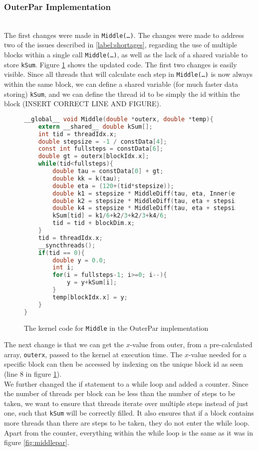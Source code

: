 \subsubsection{OuterPar Implementation} \hfill \\
The first changes were made in \texttt{Middle(…)}. The changes were made to address two of the issues described in \ref{label:shortages}, regarding the use of multiple blocks within a single call \texttt{Middle(…)}, as well as the lack of a shared variable to store \texttt{kSum}. Figure \ref{fig:outerpar} shows the updated code. The first two changes is easily  visible. Since all threads that will calculate each step in \texttt{Middle(…)} is now always within the same block, we can define a shared variable (for much faster data storing) \texttt{kSum}, and we can define the thread id to be simply the id within the block (INSERT CORRECT LINE AND FIGURE).\\

\begin{figure}[ht]
\begin{lstlisting}[language=c]
__global__ void Middle(double *outerx, double *temp){
	extern __shared__ double kSum[];
	int tid = threadIdx.x;
	double stepsize = -1 / constData[4];
	const int fullsteps = constData[6];
	double gt = outerx[blockIdx.x];
	while(tid<fullsteps){
		double tau = constData[0] + gt;
		double kk = k(tau);
		double eta = (120+(tid*stepsize));
		double k1 = stepsize * MiddleDiff(tau, eta, Inner(eta, gt, kk).y);
		double k2 = stepsize * MiddleDiff(tau, eta + stepsize/2, Inner(eta + stepsize/2, gt, kk).y);		
		double k4 = stepsize * MiddleDiff(tau, eta + stepsize, Inner(eta + stepsize, gt, kk).y);
		kSum[tid] = k1/6+k2/3+k2/3+k4/6;
		tid = tid + blockDim.x;
	}
	tid = threadIdx.x;
	__syncthreads();
	if(tid == 0){
		double y = 0.0;
		int i;
		for(i = fullsteps-1; i>=0; i--){
			y = y+kSum[i];
		}
		temp[blockIdx.x] = y;
	}
}
\end{lstlisting}
\caption{The kernel code for \texttt{Middle} in the OuterPar implementation}
\label{fig:outerpar}
\end{figure}

The next change is that we can get the $x$-value from outer, from a pre-calculated array, \texttt{outerx}, passed to the kernel at execution time. The $x$-value needed for a specific block can then be accessed by indexing on the unique block id as seen (line 8 in figure \ref{fig:outerpar}).\\

We further changed the if statement to a while loop and added a counter. Since the number of threads per block can be less than the number of steps to be taken, we want to ensure that threads iterate over multiple steps instead of just one, such that \texttt{kSum} will be correctly filled. It also ensures that if a block contains more threads than there are steps to be taken, they do not enter the while loop. Apart from the counter, everything within the while loop is the same as it was in figure \ref{fig:middlepar}.\\

